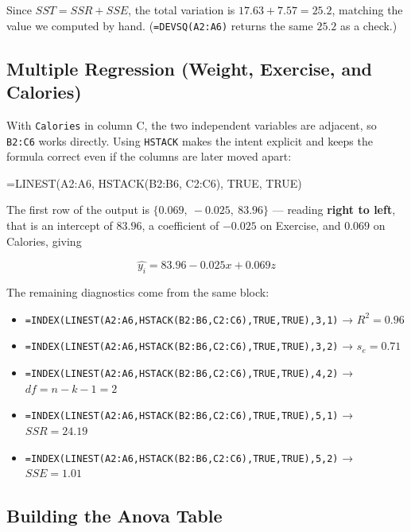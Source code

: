 \documentclass[
  11pt,
  letterpaper,
  DIV=11,
  numbers=noendperiod,
  oneside,
  open=any]{scrreprt}
\newenvironment{Shaded}{\begin{snugshade}}{\end{snugshade}}
\newcommand{\NormalTok}[1]{\textcolor[rgb]{0.00,0.23,0.31}{#1}}
\providecommand{\tightlist}{%
  \setlength{\itemsep}{0pt}\setlength{\parskip}{0pt}}\usepackage{longtable,booktabs,array}
\begin{document}
Since \(SST=SSR+SSE\), the total variation is \(17.63+7.57=25.2\),
matching the value we computed by hand. (\texttt{=DEVSQ(A2:A6)} returns
the same \(25.2\) as a check.)

\subsection*{Multiple Regression (Weight, Exercise, and
Calories)}\label{multiple-regression-weight-exercise-and-calories}

With \texttt{Calories} in column C, the two independent variables are
adjacent, so \texttt{B2:C6} works directly. Using \texttt{HSTACK} makes
the intent explicit and keeps the formula correct even if the columns
are later moved apart:

\begin{Shaded}
\begin{Highlighting}[]
\NormalTok{=LINEST(A2:A6, HSTACK(B2:B6, C2:C6), TRUE, TRUE)}
\end{Highlighting}
\end{Shaded}

The first row of the output is \(\{0.069,\ -0.025,\ 83.96\}\) ---
reading \textbf{right to left}, that is an intercept of \(83.96\), a
coefficient of \(-0.025\) on Exercise, and \(0.069\) on Calories, giving

\[\hat{y_i}=83.96-0.025x+0.069z\]

The remaining diagnostics come from the same block:

\begin{itemize}
\tightlist
\item
  \texttt{=INDEX(LINEST(A2:A6,HSTACK(B2:B6,C2:C6),TRUE,TRUE),3,1)} →
  \(R^2=0.96\)
\item
  \texttt{=INDEX(LINEST(A2:A6,HSTACK(B2:B6,C2:C6),TRUE,TRUE),3,2)} →
  \(s_e=0.71\)
\item
  \texttt{=INDEX(LINEST(A2:A6,HSTACK(B2:B6,C2:C6),TRUE,TRUE),4,2)} →
  \(df=n-k-1=2\)
\item
  \texttt{=INDEX(LINEST(A2:A6,HSTACK(B2:B6,C2:C6),TRUE,TRUE),5,1)} →
  \(SSR=24.19\)
\item
  \texttt{=INDEX(LINEST(A2:A6,HSTACK(B2:B6,C2:C6),TRUE,TRUE),5,2)} →
  \(SSE=1.01\)
\end{itemize}

\subsection*{Building the Anova Table}\label{building-the-anova-table}
\end{document}

